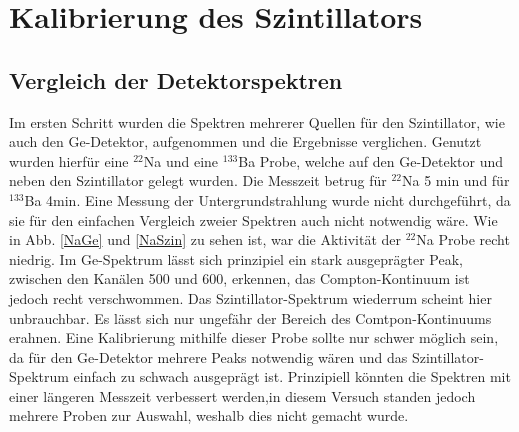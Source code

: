\section{Kalibrierung des Szintillators}

\subsection{Vergleich der Detektorspektren}

Im ersten Schritt wurden die Spektren mehrerer Quellen für den Szintillator, wie auch den Ge-Detektor, aufgenommen und die Ergebnisse verglichen.
Genutzt wurden hierfür eine $^{22}$Na und eine $^{133}$Ba Probe, welche auf den Ge-Detektor und neben den Szintillator gelegt wurden.
Die Messzeit betrug für $^{22}$Na 5 min und für $^{133}$Ba 4min.
Eine Messung der Untergrundstrahlung wurde nicht durchgeführt, da sie für den einfachen Vergleich zweier Spektren auch nicht notwendig wäre.
Wie in Abb. \ref{NaGe} und \ref{NaSzin} zu sehen ist, war die Aktivität der $^{22}$Na Probe recht niedrig.
Im Ge-Spektrum lässt sich prinzipiel ein stark ausgeprägter Peak, zwischen den Kanälen 500 und 600, erkennen, das Compton-Kontinuum ist jedoch recht verschwommen.
Das Szintillator-Spektrum wiederrum scheint hier unbrauchbar.
Es lässt sich nur ungefähr der Bereich des Comtpon-Kontinuums erahnen.
Eine Kalibrierung mithilfe dieser Probe sollte nur schwer möglich sein, da für den Ge-Detektor mehrere Peaks notwendig wären und das Szintillator-Spektrum einfach zu schwach ausgeprägt ist.
Prinzipiell könnten die Spektren mit einer längeren Messzeit verbessert werden,in diesem Versuch standen jedoch mehrere Proben zur Auswahl, weshalb dies nicht gemacht wurde.

